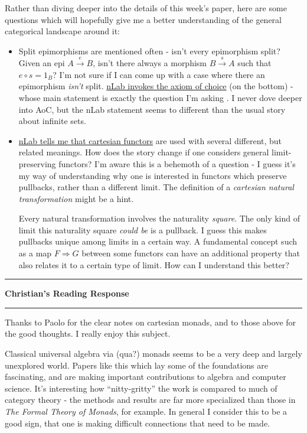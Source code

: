 \documentclass{amsart}
\newcommand{\iam}[1]{
  \vspace{0.25em}
  \hrule
  \vspace{0.25em}
  \textbf{{#1}'s Reading Response}
  \vspace{0.25em}
  \hrule
  \vspace{1em}
}
\begin{document}
Rather than diving deeper into the details of this week's paper, here are some
questions which will hopefully give me a better understanding of the general
categorical landscape around it:
\begin{itemize}
\item Split epimorphisms are mentioned often - isn't every epimorphism split? Given an epi $A \xrightarrow{e} B$, isn't there always a morphism $B \xrightarrow{s} A$ such that $e \circ s = 1_B$? I'm not sure if I can come up with a case where there an epimorphism \textit{isn't} split.
  \href{https://ncatlab.org/nlab/show/split+epimorphism}{nLab invokes the axiom
    of choice} (on the bottom) - whose main statement is exactly the question
  I'm asking . I never dove deeper into AoC, but the nLab statement seems to different than the usual story about infinite sets.
\item \href{https://ncatlab.org/nlab/show/cartesian+functor}{nLab tells me that
    cartesian functors} are used with several different, but related meanings.
  How does the story change if one considers general limit-preserving functors?
  I'm aware this is a behemoth of a question - I guess it's my way of
  understanding why one is interested in functors which preserve pullbacks, rather than a different limit. The definition of a \textit{cartesian natural transformation} might be
  a hint.

  Every natural transformation involves the naturality \textit{square}.  The
  only kind of limit this naturality square \textit{could be} is a pullback. I guess this
  makes pullbacks unique among limits in a certain way. A fundamental concept
  such as a map $F \Rightarrow G$ between some functors can have an additional
  property that also relates it to a certain type of limit. How can I
  understand this better?
\end{itemize}

\iam{Christian}

Thanks to Paolo for the clear notes on cartesian monads, and to those above for the good thoughts. I really enjoy this subject.

Classical universal algebra via (qua?) monads seems to be a very deep and largely unexplored world. Papers like this which lay some of the foundations are fascinating, and are making important contributions to algebra and computer science. It's interesting how ``nitty-gritty'' the work is compared to much of category theory - the methods and results are far more specialized than those in \textit{The Formal Theory of Monads}, for example. In general I consider this to be a good sign, that one is making difficult connections that need to be made.
\end{document}

